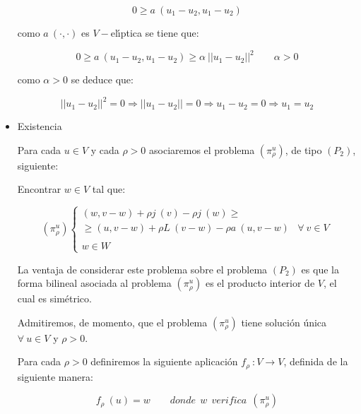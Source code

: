 \begin{demosteorema}
\begin{itemize}
\begin{displaymath}
0 \ge a\ (u_1-u_2,u_1-u_2)
\end{displaymath}

como $a\ (\cdot,\cdot )$ es $V-$el\'{\i}ptica se tiene que:

\begin{displaymath}
0 \ge a\ (u_1-u_2,u_1-u_2) \ge \alpha\ ||u_1-u_2 ||^2 \qquad \alpha > 0
\end{displaymath}

como $\alpha > 0$ se deduce que:

\begin{displaymath}
||u_1-u_2||^2=0\Longrightarrow ||u_1-u_2|| = 0\Longrightarrow u_1-u_2=0
\Longrightarrow u_1=u_2
\end{displaymath}

\item Existencia \newline

Para cada $u \in V$ y cada $\rho > 0$ asociaremos el problema $(\pi^u_{\rho})$,
de tipo $(P_2)$, siguiente:\newline

Encontrar $w \in V$ tal que:

\begin{equation} \label{eq:piuro}
(\pi^u_{\rho}) \left\{ \begin{array}{lr}
(w,v-w)+\rho j\ (v)-\rho j\ (w) \ge \\
\ge (u,v-w)+\rho L\ (v-w)-\rho a\ (u,v-w) & \forall \ v \in V \\
\\
w \in W
\end{array} \right.
\end{equation}

La ventaja de considerar este problema sobre el problema $(P_2)$ es que la 
forma bilineal asociada al problema $(\pi^u_{\rho})$ es el producto interior de
$V$, el cual es sim\'etrico.\newline

Admitiremos, de momento, que el problema $(\pi^u_{\rho})$ tiene soluci\'on
\'unica $\forall \ u \in V$ y $\rho > 0$.\newline

Para cada $\rho > 0$ definiremos la siguiente aplicaci\'on
$f_{\rho}\ :V \longrightarrow V$, definida de la siguiente manera:

\begin{displaymath}
f_{\rho}\ (u) = w \qquad donde \ \ w \ \ verifica \ \ (\pi^u_{\rho})
\end{displaymath}


\end{itemize}
\end{demosteorema}
